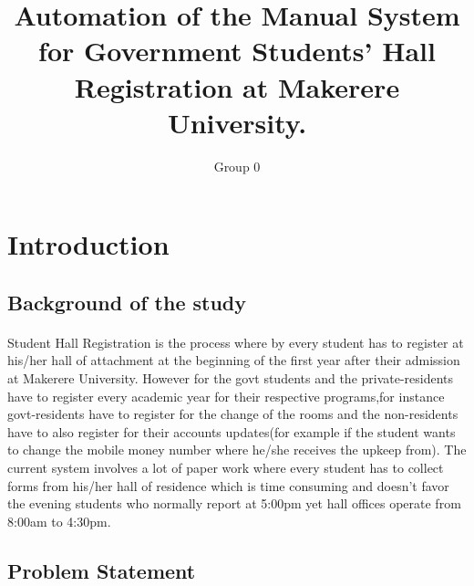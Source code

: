 \documentclass[12pt]{article}
\begin{document}
	
	
	\title{Automation of the Manual System for Government Students’ Hall Registration at Makerere University.}
	
	\author{Group 0}
	
	\maketitle
	\section{Introduction}
	\subsection{Background of the study}
	\paragraph{}
	Student Hall Registration is the process where by every student has to register at his/her hall of attachment at the beginning of the first year after their admission at Makerere University.
	However for the govt students and the private-residents have to register every academic year for their respective programs,for instance govt-residents have to register for the change of the rooms and the non-residents have to also register for their accounts updates(for example if the student wants to change the mobile money number where he/she receives the upkeep from).
	The current system involves a lot of paper work where every student has to collect forms from his/her hall of residence which is time consuming and  doesn't favor the evening students who normally report at 5:00pm yet hall offices operate from 8:00am  to 4:30pm. 
	\subsection{Problem Statement}
\end{document}
